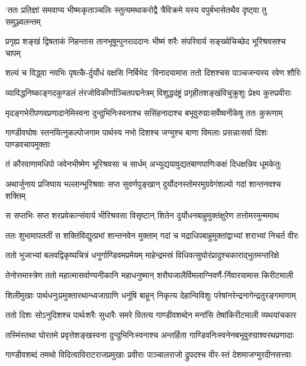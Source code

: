 \twolineshloka
{`ततः प्रतिज्ञां समवाप्य भीष्मःकृताञ्चलिः स्तुत्यमथाकरोद्वै}
{त्रैविक्रमे यस्य वपुर्बभासेतथैव दृष्ट्वा तु समुञ्ज्वलन्तम्}


\twolineshloka
{प्रगृह्य शङ्खं द्विषताकं निहन्तास तानभूषून्पुनराददानः}
{भीष्मं शरैः संपरिवार्य सङ्ख्येचिच्छेद भूरिश्रवसश्च चापम्}


\twolineshloka
{शल्यं च विद्ध्वा नवभिः पृषत्कै-र्दुर्योधं वक्षसि निर्बिभेद}
{'विनादयामास ततो दिशश्चस पाञ्चजन्यस्य रवेण शौरिः}


\twolineshloka
{व्याविद्धनिष्काङ्गदकुण्डलं तंरजोविकीर्णाञ्चितपद्मनेत्रम्}
{विशुद्धदंष्ट्रं प्रगृहीतशङ्खंविचुक्रुशुः प्रेक्ष्य कुरुप्रवीराः}


\twolineshloka
{मृदङ्गभेरीपणवप्रणादानेमिस्वना दुन्दुभिनिःस्वनाश्च}
{ससिंहनादाश्च बभूवुरुग्राःसर्वेष्वनीकेषु ततः कुरूणाम्}


\twolineshloka
{गाण्डीवघोषः स्तनयित्नुकल्पोजगाम पार्थस्य नभो दिशश्च}
{जग्मुश्च बाणा विमलाः प्रसन्नाःसर्वा दिशः पाण्डवचापमुक्ताः}


\twolineshloka
{तं कौरवाणामधिपो जवेनभीष्मेण भूरिश्रवसा च सार्धम्}
{अभ्युद्ययावुद्यतबाणपाणिःकक्षं दिधक्षन्निव धूमकेतुः}


\twolineshloka
{अथार्जुनाय प्रजिघाय भल्लान्भूरिश्रवाः सप्त सुवर्णपुङ्खान्}
{दुर्योदनस्तोमरमुग्रवेगंशल्यो गदां शान्तनवश्च शक्तिम्}


\twolineshloka
{स सप्तभिः सप्त शरप्रवेकान्संवार्य भीरिश्रवसा विसृष्टान्}
{शितेन दुर्योधनबाहुमुक्तंक्षुरेण तत्तोमरमुन्ममाथ}


\twolineshloka
{ततः शुभामापततीं स शक्तिंविद्युत्प्रभां शान्तनवेन मुक्ताम्}
{गदां च मद्राधिपबाहुमुक्तांद्वाभ्यां शराभ्यां निचर्त वीरः}


\twolineshloka
{ततो भुजाभ्यां बलवद्विकृष्यचित्रं धनुर्गाण्डिवमप्रमेयम्}
{माहेन्द्रमस्रं विधिवत्सुघोरंप्रादुश्चकाराद्भुतमन्तरिक्षे}


\twolineshloka
{तेनोत्तमास्त्रेण ततो महात्मासर्वाण्यनीकानि महाधनुष्मान्}
{शरौघजालैर्विमलाग्निवर्णै-र्निवारयामास किरीटमाली}


\threelineshloka
{शिलीमुखाः पार्थधनुःप्रमुक्तारथान्ध्वजाग्राणि धनूंषि बाहून्}
{निकृत्य देहान्विविशुः परेषांनरेन्द्रनागेन्द्रतुरङ्गमाणाम्}
{}


\twolineshloka
{ततो दिशः सोऽनुदिशश्च पार्थःशरैः सुधारैः समरे वितत्य}
{गाण्डीवशब्देन मनांसि तेषांकिरीटमाली व्यथयांचकार}


\twolineshloka
{तस्मिंस्तथा घोरतमे प्रवृत्तेशङ्खस्वना दुन्दुभिनिःस्वनाश्च}
{अन्तर्हिता गाण्डिवनिःस्वनेनबभूवुरुग्राश्वरथप्रणादाः}


\twolineshloka
{गाण्डीवशब्दं तमथो विदित्वाविराटराजप्रमुखाः प्रवीराः}
{पाञ्चालराजो द्रुपदश्च वीर-स्तं देशमाजग्मुरदीनसत्त्वाः}



